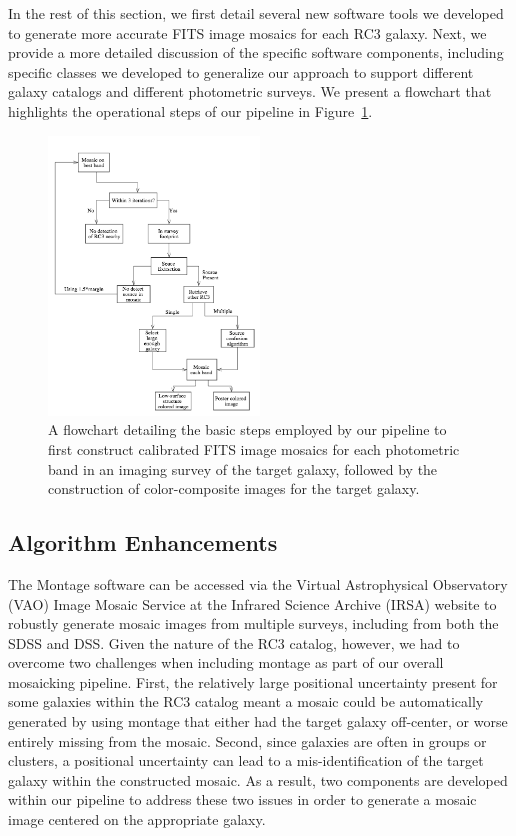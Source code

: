 \documentclass[authoryear, 12pt, 5p, times]{elsarticle}
\begin{document}
In the rest of this section, we first detail several new software tools we developed to generate more accurate FITS image mosaics for each RC3 galaxy. Next, we provide a more detailed discussion of the specific software components, including specific classes we developed to generalize our approach to support different galaxy catalogs and different photometric surveys. We present a flowchart that highlights the operational steps of our pipeline in Figure~\ref{flowchart}.

\begin{figure}[h]
\includegraphics[width=0.5\textwidth]{figures/algorithm.png}
\caption{A flowchart detailing the basic steps employed by our pipeline to first construct calibrated FITS image mosaics for each photometric band in an imaging survey of the target galaxy, followed by the construction of color-composite images for the target galaxy.}
\label{flowchart}
\end{figure}

\subsection{Algorithm Enhancements}

The Montage software can be accessed via the Virtual Astrophysical Observatory (VAO) Image Mosaic Service at the Infrared Science Archive (IRSA) website to robustly generate mosaic images from multiple surveys, including from both the SDSS and DSS. Given the nature of the RC3 catalog, however, we had to overcome two challenges when including montage as part of our overall mosaicking pipeline. First, the relatively large positional uncertainty present for some galaxies within the RC3 catalog meant a mosaic could be automatically generated by using montage that either had the target galaxy off-center, or worse entirely missing from the mosaic. Second, since galaxies are often in groups or clusters, a positional uncertainty can lead to a mis-identification of the target galaxy within the constructed mosaic. As a result, two components are developed within our pipeline to address these two issues in order to generate a mosaic image centered on the appropriate galaxy.
\end{document}
